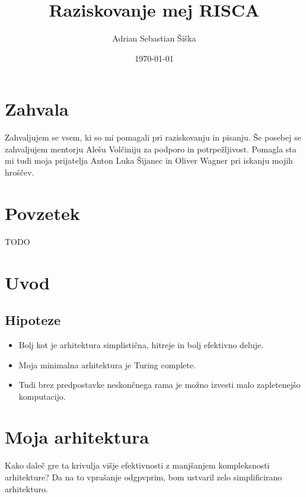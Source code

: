 \documentclass[12pt]{article}
\begin{document}
\linespread{1.25}
\title{Raziskovanje mej RISCA}
\author{Adrian Sebastian Šiška}
\date{\today}
\maketitle

\pagebreak
{}

\tableofcontents

\pagebreak

\listoffigures

\pagebreak

\section{Zahvala}
Zahvaljujem se vsem, ki so mi pomagali pri raziskovanju in pisanju.
Še posebej se zahvaljujem mentorju Alešu Volčiniju za podporo in potrpežljivost.
Pomagla sta mi tudi moja prijatelja Anton Luka Šijanec in Oliver Wagner pri iskanju mojih hroščev.

\pagebreak

\section{Povzetek}
TODO
\pagebreak


\section{Uvod}

\subsection{Hipoteze}
\begin{itemize}
  \item Bolj kot je arhitektura simplistična, hitreje in bolj efektivno deluje.
  \item Moja minimalna arhitektura je Turing complete.
  \item Tudi brez predpostavke neskončnega rama je možno izvesti malo zapletenejšo komputacijo.
\end{itemize}

\section{Moja arhitektura}
Kako daleč gre ta krivulja višje efektivnosti z manjšanjem kompleksnosti arhitekture?
Da na to vprašanje odgpvprim, bom ustvaril zelo simplificirano arhitekturo.
\end{document}
